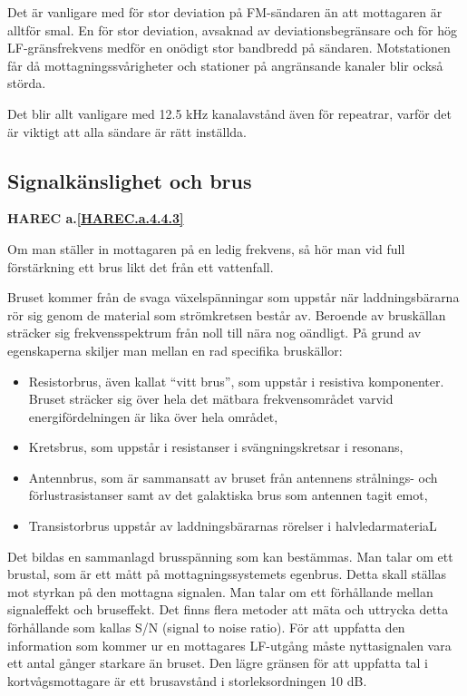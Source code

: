Det är vanligare med för stor deviation på FM-sändaren än att
mottagaren är alltför smal. En för stor deviation, avsaknad av
deviationsbegränsare och för hög LF-gränsfrekvens medför en onödigt
stor bandbredd på sändaren. Motstationen får då mottagningssvårigheter
och stationer på angränsande kanaler blir också störda.

Det blir allt vanligare med 12.5 kHz kanalavstånd även för repeatrar,
varför det är viktigt att alla sändare är rätt inställda.

\subsection{Signalkänslighet och brus}
\textbf{HAREC a.\ref{HAREC.a.4.4.3}\label{myHAREC.a.4.4.3}}

Om man ställer in mottagaren på en ledig frekvens, så hör man vid full
förstärkning ett brus likt det från ett vattenfall.

Bruset kommer från de svaga växelspänningar som uppstår när
laddningsbärarna rör sig genom de material som strömkretsen består
av. Beroende av bruskällan sträcker sig frekvensspektrum från noll
till nära nog oändligt. På grund av egenskaperna skiljer man mellan en
rad specifika bruskällor:
\begin{itemize}
\item Resistorbrus, även kallat ``vitt brus'', som uppstår i resistiva
  komponenter. Bruset sträcker sig över hela det mätbara
  frekvensområdet varvid energifördelningen är lika över hela området,

\item Kretsbrus, som uppstår i resistanser i svängningskretsar i
  resonans,

\item Antennbrus, som är sammansatt av bruset från antennens
  strålnings- och förlustrasistanser samt av det galaktiska brus som
  antennen tagit emot,

\item Transistorbrus uppstår av laddningsbärarnas rörelser i
  halvledarmateriaL
\end{itemize}

Det bildas en sammanlagd brusspänning som kan bestämmas. Man talar om
ett brustal, som är ett mått på mottagningssystemets egenbrus. Detta
skall ställas mot styrkan på den mottagna signalen. Man talar om ett
förhållande mellan signaleffekt och bruseffekt. Det finns flera
metoder att mäta och uttrycka detta förhållande som kallas S/N (signal
to noise ratio). För att uppfatta den information som kommer ur en
mottagares LF-utgång måste nyttasignalen vara ett antal gånger
starkare än bruset. Den lägre gränsen för att uppfatta tal i
kortvågsmottagare är ett brusavstånd i storleksordningen 10 dB.

